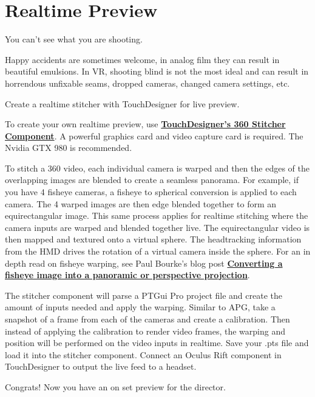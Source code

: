 \chapter{Realtime Preview}
\pagecolor{white}
\label{chap:11}
\begin{fullwidth}

\problem

{\large You can’t see what you are shooting. \par}


Happy accidents are sometimes welcome, in analog film they can result in beautiful emulsions. In VR, shooting blind is not the most ideal and can result in horrendous unfixable seams, dropped cameras, changed camera settings, etc. 


\solution

{\large Create a realtime stitcher with TouchDesigner for live preview. \par}

To create your own realtime preview, use \textbf{\href{https://www.derivative.ca/wiki088/index.php?title=Stitcher}{TouchDesigner’s 360 Stitcher Component}}. A powerful graphics card and video capture card is required. The Nvidia GTX 980 is recommended. 

To stitch a 360 video, each individual camera is warped and then the edges of the overlapping images are blended to create a seamless panorama. For example, if you have 4 fisheye cameras, a fisheye to spherical conversion is applied to each camera. The 4 warped images are then edge blended together to form an equirectangular image. This same process applies for realtime stitching where the camera inputs are warped and blended together live. The equirectangular video is then mapped and textured onto a virtual sphere. The headtracking information from the HMD drives the rotation of a virtual camera inside the sphere. For an in depth read on fisheye warping, see Paul Bourke's blog post \textbf{\href{http://paulbourke.net/dome/fish2/}{Converting a fisheye image into a panoramic or perspective projection}}.

The stitcher component will parse a PTGui Pro project file and create the amount of inputs needed and apply the warping. Similar to APG, take a snapshot of a frame from each of the cameras and create a calibration. Then instead of applying the calibration to render video frames, the warping and position will be performed on the video inputs in realtime. Save your .pts file and load it into the stitcher component. Connect an Oculus Rift component in TouchDesigner to output the live feed to a headset.

Congrats! Now you have an on set preview for the director.

\clearpage
\end{fullwidth}
